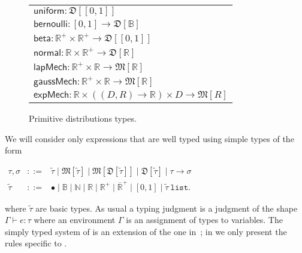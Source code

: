 \documentclass{sig-alternate-05-2015}
\theoremstyle{plain}
\theoremstyle{definition}
\theoremstyle{corollary}
\def\reals{\ensuremath{\mathbb{R}}\xspace}
\newcommand{\coty}[1]{\widetilde{#1}}
\def\kwlist{\mathtt{list}}
\newcommand{\stfun}[2]{{#1} \rightarrow {#2}}
\newcommand{\stmod}[1]{\mathfrak{M}[{#1}]}
\newcommand{\stunit}[0]{\bullet}
\newcommand{\stbool}[0]{\mathbb{B}}
\newcommand{\stnat}[0]{\mathbb{N}}
\newcommand{\stlist}[1]{{#1}\ \kwlist}
\newcommand{\vbar}[0]{\mathrel{|}}
\def\R{\mathbb{R}}
\newcommand{\rplusinfty}{\ensuremath{\overline{\R}^+}}
\newcommand{\rplus}{\R^+}
\newcommand{\stdist}[1]{\mathfrak{D}[{#1}]}
\begin{document}
\begin{figure}[t]
  \begin{tabular}{l}
$\mathsf{uniform}: \stdist{[0,1]}$\\
$\mathsf{bernoulli}: [0,1] \to \stdist{\stbool}$\\
$\mathsf{beta}: \rplus\times \rplus \to
    \stdist{[0,1]}$\\
$\mathsf{normal}: \reals\times \rplus \to \stdist{\R}$\\[1mm]
$\mathsf{lapMech}: \rplus\times \R \to
\stmod{\reals}$\\
$\mathsf{gaussMech}: \rplus\times \R \to \stmod{\R}$\\
$\mathsf{expMech}: \R\times ((D,R)\to \R) \times D \to
\stmod{R}$\\
        \end{tabular}
  \caption{\label{fig:pcfpdist}Primitive distributions types.}
\end{figure}

We will consider only expressions that are well typed using simple types
of the form
\begin{center}
  $\begin{array}{rcl}
    \tau,\sigma
      & ::= & \coty{\tau} \vbar
              \stmod{\coty{\tau}} \vbar               
              \stmod{\stdist{\coty{\tau}}} \vbar               
              \stdist{\coty{\tau}} \vbar
              \stfun{\tau}{\sigma}\\
    \coty{\tau}
      & ::= & \stunit \vbar \stbool \vbar \stnat \vbar \R \vbar \rplus\vbar
              \rplusinfty \vbar [0,1]\vbar
              \stlist{\coty{\tau}} .
  \end{array}$
\end{center}
where $\coty{\tau}$ are basic types. As usual a typing judgment is a
judgment of the shape $\Gamma\vdash e:\tau$ where an environment $\Gamma$ is an
assignment of types to variables. The simply typed system of \THESYSTEM is an extension of the one
in~\citet{BartheGAHRS15}; in  we only present the rules specific to \THESYSTEM.
\end{document}
